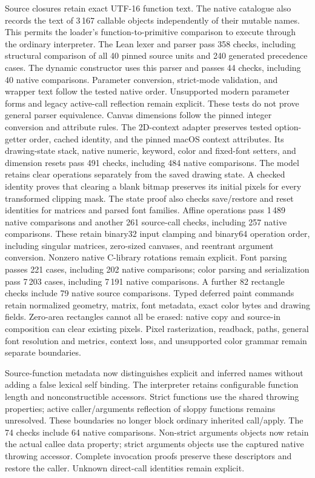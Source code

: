 \documentclass[11pt,a4paper]{article}
\numberwithin{equation}{section}
\theoremstyle{definition}
\theoremstyle{remark}
\begin{document}
Source closures retain exact UTF-16 function text. The native catalogue also records the text of 3\,167 callable objects independently of their mutable names. This permits the loader's function-to-primitive comparison to execute through the ordinary interpreter. The Lean lexer and parser pass 358 checks, including structural comparison of all 40 pinned source units and 240 generated precedence cases. The dynamic constructor uses this parser and passes 44 checks, including 40 native comparisons. Parameter conversion, strict-mode validation, and wrapper text follow the tested native order. Unsupported modern parameter forms and legacy active-call reflection remain explicit. These tests do not prove general parser equivalence. Canvas dimensions follow the pinned integer conversion and attribute rules. The 2D-context adapter preserves tested option-getter order, cached identity, and the pinned macOS context attributes. Its drawing-state stack, native numeric, keyword, color and fixed-font setters, and dimension resets pass 491 checks, including 484 native comparisons. The model retains clear operations separately from the saved drawing state. A checked identity proves that clearing a blank bitmap preserves its initial pixels for every transformed clipping mask. The state proof also checks save/restore and reset identities for matrices and parsed font families. Affine operations pass 1\,489 native comparisons and another 261 source-call checks, including 257 native comparisons. These retain binary32 input clamping and binary64 operation order, including singular matrices, zero-sized canvases, and reentrant argument conversion. Nonzero native C-library rotations remain explicit. Font parsing passes 221 cases, including 202 native comparisons; color parsing and serialization pass 7\,203 cases, including 7\,191 native comparisons. A further 82 rectangle checks include 79 native source comparisons. Typed deferred paint commands retain normalized geometry, matrix, font metadata, exact color bytes and drawing fields. Zero-area rectangles cannot all be erased: native copy and source-in composition can clear existing pixels. Pixel rasterization, readback, paths, general font resolution and metrics, context loss, and unsupported color grammar remain separate boundaries.

Source-function metadata now distinguishes explicit and inferred names without adding a false lexical self binding. The interpreter retains configurable function length and nonconstructible accessors. Strict functions use the shared throwing properties; active caller/arguments reflection of sloppy functions remains unresolved. These boundaries no longer block ordinary inherited call/apply. The 74 checks include 64 native comparisons. Non-strict arguments objects now retain the actual callee data property; strict arguments objects use the captured native throwing accessor. Complete invocation proofs preserve these descriptors and restore the caller. Unknown direct-call identities remain explicit.
\end{document}
